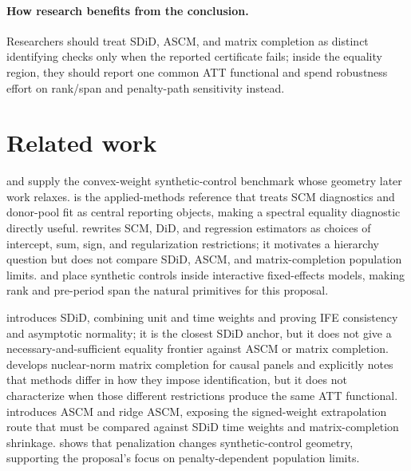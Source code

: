 \documentclass[11pt]{article}
\theoremstyle{definition}
\theoremstyle{plain}
\theoremstyle{remark}
\begin{document}
\paragraph{How research benefits from the conclusion.}
Researchers should treat SDiD, ASCM, and matrix completion as distinct identifying checks only when the reported certificate fails; inside the equality region, they should report one common ATT functional and spend robustness effort on rank/span and penalty-path sensitivity instead.

\section{Related work}
\citet{AbadieDiamondHainmueller2010} and \citet{AbadieDiamondHainmueller2015} supply the convex-weight synthetic-control benchmark whose geometry later work relaxes.  \citet{Abadie2021} is the applied-methods reference that treats SCM diagnostics and donor-pool fit as central reporting objects, making a spectral equality diagnostic directly useful.  \citet{DoudchenkoImbens2016} rewrites SCM, DiD, and regression estimators as choices of intercept, sum, sign, and regularization restrictions; it motivates a hierarchy question but does not compare SDiD, ASCM, and matrix-completion population limits.  \citet{Xu2017} and \citet{GobillonMagnac2016} place synthetic controls inside interactive fixed-effects models, making rank and pre-period span the natural primitives for this proposal.

\citet{ArkhangelskyAtheyHirshbergImbensWager2021} introduces SDiD, combining unit and time weights and proving IFE consistency and asymptotic normality; it is the closest SDiD anchor, but it does not give a necessary-and-sufficient equality frontier against ASCM or matrix completion.  \citet{AtheyBayatiDoudchenkoImbensKhosravi2021} develops nuclear-norm matrix completion for causal panels and explicitly notes that methods differ in how they impose identification, but it does not characterize when those different restrictions produce the same ATT functional.  \citet{BenMichaelFellerRothstein2021} introduces ASCM and ridge ASCM, exposing the signed-weight extrapolation route that must be compared against SDiD time weights and matrix-completion shrinkage.  \citet{AbadieLHour2021} shows that penalization changes synthetic-control geometry, supporting the proposal's focus on penalty-dependent population limits.
\end{document}
